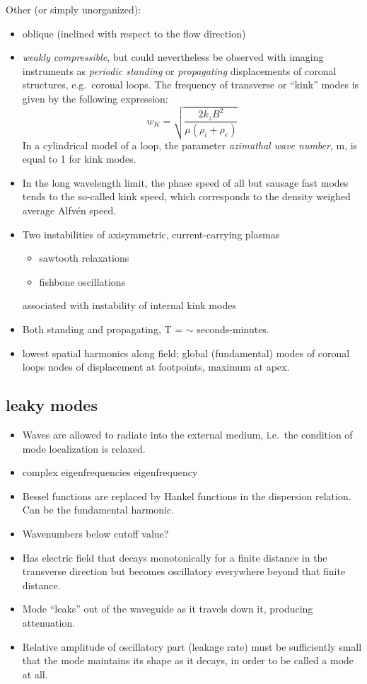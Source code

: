 \documentclass{article}
\begin{document}
Other (or simply unorganized):
\begin{itemize}
    \item oblique (inclined with respect to the flow direction)
    \item \emph{weakly compressible}, but could nevertheless be
        observed with imaging instruments as \emph{periodic standing}
        or \emph{propagating} displacements of coronal structures, e.g.\ coronal loops.
        The frequency of transverse or ``kink'' modes is given by the following expression:
            $$ w_K = \sqrt{ \frac{2k_zB^2}{\mu(\rho_i+\rho_e)}  }   $$
        In a cylindrical model of a loop,
        the parameter \emph{azimuthal wave number},
        m, is equal to 1 for kink modes.
    \item In the long wavelength limit, the phase speed of all but
        sausage fast modes tends to the so-called kink speed,
        which corresponds to the density weighed average Alfv\'en speed.
    \item Two instabilities of axisymmetric, current-carrying plasmas
        \begin{itemize}
            \item sawtooth relaxations
            \item fishbone oscillations
        \end{itemize}
        associated with instability of internal kink modes
    \item Both standing and propagating, T = $\sim$ seconds-minutes.
    \item lowest spatial harmonics along field; global (fundamental)
        modes of coronal loops nodes of displacement at footpoints,
        maximum at apex.
\end{itemize}

\subsection{leaky modes}
\begin{itemize}
    \item Waves are allowed to radiate into the external medium,
        i.e.\ the condition of mode localization is relaxed.
    \item complex eigenfrequencies eigenfrequency 
    \item Bessel functions are replaced by Hankel functions in the
        dispersion relation. Can be the fundamental harmonic.
    \item Wavenumbers below cutoff value?
    \item Has electric field that decays monotonically for a finite
        distance in the transverse direction but becomes oscillatory
        everywhere beyond that finite distance.
    \item Mode ``leaks'' out of
        the waveguide as it travels down it, producing attenuation.
    \item Relative amplitude of oscillatory part (leakage rate)
        must be sufficiently small that the mode maintains its
        shape as it decays, in order to be called a mode at all.
\end{itemize}
\end{document}
